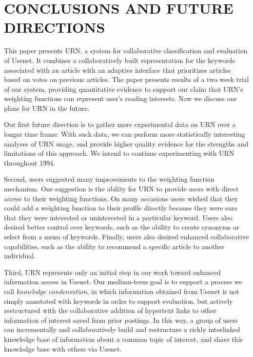
\section{CONCLUSIONS AND FUTURE DIRECTIONS}
\label{sec:conclusion}

This paper presents URN, a system for collaborative classification and
evaluation of Usenet. It combines a collaboratively built representation
for the keywords associated with an article with an adaptive interface that
prioritizes articles based on votes on previous articles. The paper
presents results of a two week trial of our system, providing quantitative
evidence to support our claim that URN's weighting functions can represent
user's reading interests. Now we discuss our plans for URN in the future.

Our first future direction is to gather more experimental data on URN over
a longer time frame. With such data, we can perform more statistically
interesting analyses of URN usage, and provide higher quality evidence for
the strengths and limitations of this approach.  We intend to continue
experimenting with URN throughout 1994.

Second, users suggested many improvements to the weighting function
mechanism. One suggestion is the ability for URN to provide users with
direct access to their weighting functions. On many occasions users wished
that they could add a weighting function to their profile directly because
they were sure that they were interested or uninterested in a particular
keyword. Users also desired better control over keywords, such as the
ability to create synonyms or select from a menu of keywords.  Finally,
users also desired enhanced collaborative capabilities, such as the ability
to recommend a specific article to another individual.

Third, URN represents only an initial step in our work toward enhanced
information access in Usenet.  Our medium-term goal is to support a process
we call {\em knowledge condensation}, in which information obtained from
Usenet is not simply annotated with keywords in order to support
evaluation, but actively restructured with the collaborative addition of
hypertext links to other information of interest saved from prior postings.
In this way, a group of users can incrementally and collaboratively build
and restructure a richly interlinked knowledge base of information about a
common topic of interest, and share this knowledge base with others via
Usenet.

